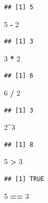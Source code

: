 \documentclass[
]{book}
\newenvironment{Shaded}{\begin{snugshade}}{\end{snugshade}}
\newcommand{\DecValTok}[1]{\textcolor[rgb]{0.00,0.00,0.81}{#1}}
\newcommand{\SpecialCharTok}[1]{\textcolor[rgb]{0.81,0.36,0.00}{\textbf{#1}}}
\begin{document}
\begin{verbatim}
## [1] 5
\end{verbatim}

\begin{Shaded}
\begin{Highlighting}[]
\DecValTok{5} \SpecialCharTok{{-}} \DecValTok{2}
\end{Highlighting}
\end{Shaded}

\begin{verbatim}
## [1] 3
\end{verbatim}

\begin{Shaded}
\begin{Highlighting}[]
\DecValTok{3} \SpecialCharTok{*} \DecValTok{2}
\end{Highlighting}
\end{Shaded}

\begin{verbatim}
## [1] 6
\end{verbatim}

\begin{Shaded}
\begin{Highlighting}[]
\DecValTok{6} \SpecialCharTok{/} \DecValTok{2}
\end{Highlighting}
\end{Shaded}

\begin{verbatim}
## [1] 3
\end{verbatim}

\begin{Shaded}
\begin{Highlighting}[]
\DecValTok{2}\SpecialCharTok{\^{}}\DecValTok{3}
\end{Highlighting}
\end{Shaded}

\begin{verbatim}
## [1] 8
\end{verbatim}

\begin{Shaded}
\begin{Highlighting}[]
\DecValTok{5} \SpecialCharTok{\textgreater{}} \DecValTok{3}
\end{Highlighting}
\end{Shaded}

\begin{verbatim}
## [1] TRUE
\end{verbatim}

\begin{Shaded}
\begin{Highlighting}[]
\DecValTok{5} \SpecialCharTok{==} \DecValTok{3}
\end{Highlighting}
\end{Shaded}
\end{document}
